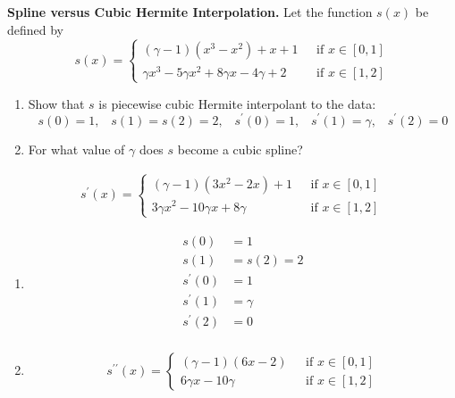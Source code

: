 \textbf{Spline versus Cubic Hermite Interpolation.} Let the function
$s(x)$ be defined by
\[
s(x) = \left\{
\begin{aligned}
(\gamma - 1)(x^3 - x^2) + x + 1 &\,\,\,\, \text{if}\,\, x\in [0,1] \\
\gamma x^3 - 5 \gamma x^2 + 8 \gamma x - 4 \gamma + 2 &\,\,\,\, \text{if}\,\, x\in [1,2]
\end{aligned}
\right.
\]

\begin{enumerate}
\item Show that $s$ is piecewise cubic Hermite interpolant to the
  data:
\[
s(0)=1, \;\;\; s(1)=s(2)=2, \;\;\; s^\prime(0)=1, \;\;\; s^\prime(1) =
\gamma, \;\;\; s^\prime(2)=0
\]
\item For what value of $\gamma$ does $s$ become a cubic spline?
\end{enumerate}

{\color{blue}

\[
\begin{aligned}
s^\prime(x) = \left\{
\begin{aligned}
(\gamma - 1)(3 x^2 - 2x) + 1 &\,\,\,\, \text{if}\,\, x\in [0,1] \\
3 \gamma x^2 - 10 \gamma x + 8 \gamma &\,\,\,\, \text{if}\,\, x\in [1,2]
\end{aligned}
\right.
\end{aligned}
\]

\begin{enumerate}
\item
\[
\begin{aligned}
s(0) &= 1 \\
s(1) &= s(2) = 2 \\
s^\prime(0) &= 1 \\
s^\prime(1) &= \gamma \\
s^\prime(2) &= 0 \\
\end{aligned}
\]

\item

\begin{align*}
s^{\prime\prime}(x) = \left\{
\begin{aligned}
(\gamma - 1)(6x - 2)
&\,\,\,\, \text{if}\,\, x\in [0,1] \\
6 \gamma x - 10 \gamma
&\,\,\,\, \text{if}\,\, x\in [1,2]
\end{aligned}
\right.
\end{align*}



\end{enumerate}

}
